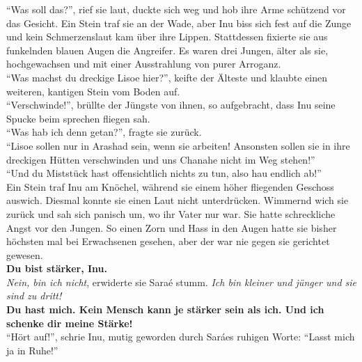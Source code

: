 ``Was soll das?'', rief sie laut, duckte sich weg und hob ihre Arme schützend vor das Gesicht.
Ein Stein traf sie an der Wade, aber Inu biss sich fest auf die Zunge und kein Schmerzenslaut kam 
über ihre Lippen. Stattdessen fixierte sie aus funkelnden blauen Augen die Angreifer. Es waren drei 
Jungen, älter als sie, hochgewachsen und mit einer Ausstrahlung von purer Arroganz. \\
``Was machst du dreckige Lisoe hier?'', keifte der Älteste und klaubte einen weiteren, kantigen 
Stein vom Boden auf. \\
``Verschwinde!'', brüllte der Jüngste von ihnen, so aufgebracht, dass Inu seine Spucke beim 
sprechen fliegen sah.\\
``Was hab ich denn getan?'', fragte sie zurück.\\
``Lisoe sollen nur in Arashad sein, wenn sie arbeiten! Ansonsten sollen sie in ihre dreckigen 
Hütten verschwinden und uns Chanahe nicht im Weg stehen!''\\
``Und du Miststück hast offensichtlich nichts zu tun, also hau endlich ab!''\\
Ein Stein traf Inu am Knöchel, während sie einem höher fliegenden Geschoss auswich. Diesmal konnte 
sie einen Laut nicht unterdrücken. Wimmernd wich sie zurück und sah sich panisch um, wo ihr Vater 
nur war. Sie hatte schreckliche Angst vor den Jungen. So einen Zorn und Hass in den Augen hatte sie 
bisher höchsten mal bei Erwachsenen gesehen, aber der war nie gegen sie gerichtet gewesen.\\
\textbf{Du bist stärker, Inu.}\\
\textit{Nein, bin ich nicht}, erwiderte sie Saraé stumm. \textit{Ich bin kleiner und jünger und sie 
sind zu dritt!}\\
\textbf{Du hast mich. Kein Mensch kann je stärker sein als ich. Und ich schenke dir meine Stärke!}\\
``Hört auf!'', schrie Inu, mutig geworden durch Saráes ruhigen Worte: ``Lasst mich ja in Ruhe!''\\


